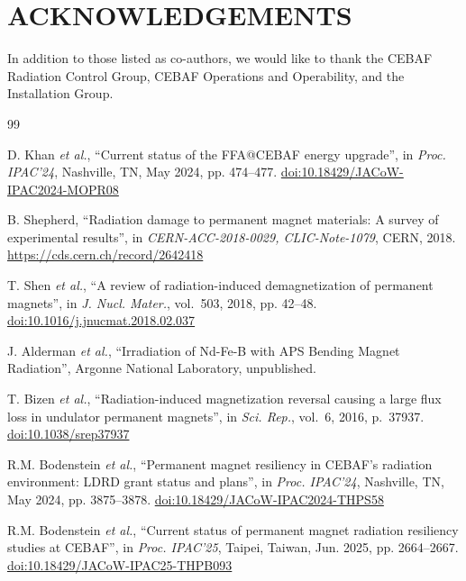 \documentclass[a4paper,
               ]{jacow}
\begin{document}
\section{ACKNOWLEDGEMENTS}
In addition to those listed as co-authors, we would like to thank the CEBAF Radiation Control Group, CEBAF Operations and Operability, and the Installation Group.

%
%
    {\printbibliography}%
    {%

    \begin{thebibliography}{99}   %

            D. Khan \emph{et al.},
            ``Current status of the FFA@CEBAF energy upgrade'',
            in \emph{Proc. IPAC'24}, Nashville, TN, May 2024, pp. 474--477.
            \url{doi:10.18429/JACoW-IPAC2024-MOPR08}

           B. Shepherd,
           ``Radiation damage to permanent magnet materials: A survey of experimental results'',
           in \emph{CERN-ACC-2018-0029, CLIC-Note-1079}, CERN, 2018.
           \url{https://cds.cern.ch/record/2642418}

            T. Shen \emph{et al.},
            ``A review of radiation-induced demagnetization of permanent magnets'',
            in \emph{J. Nucl. Mater.}, vol.~503, 2018, pp. 42--48.
            \url{doi:10.1016/j.jnucmat.2018.02.037}

            J. Alderman \emph{et al.},
            ``Irradiation of Nd-Fe-B with APS Bending Magnet Radiation'',
            Argonne National Laboratory, unpublished.

            T. Bizen \emph{et al.},
            ``Radiation-induced magnetization reversal causing a large flux loss in undulator permanent magnets'',
            in \emph{Sci. Rep.}, vol.~6, 2016, p.~37937.
            \url{doi:10.1038/srep37937}

            R.M. Bodenstein \emph{et al.},
            ``Permanent magnet resiliency in CEBAF's radiation environment: LDRD grant status and plans'',
            in \emph{Proc. IPAC'24}, Nashville, TN, May 2024, pp. 3875--3878.
            \url{doi:10.18429/JACoW-IPAC2024-THPS58}

             R.M. Bodenstein \emph{et al.},
            ``Current status of permanent magnet radiation resiliency studies at CEBAF'',
            in \emph{Proc. IPAC'25}, Taipei, Taiwan, Jun. 2025, pp. 2664--2667.
            \url{doi:10.18429/JACoW-IPAC25-THPB093}


\end{thebibliography}}
\end{document}
